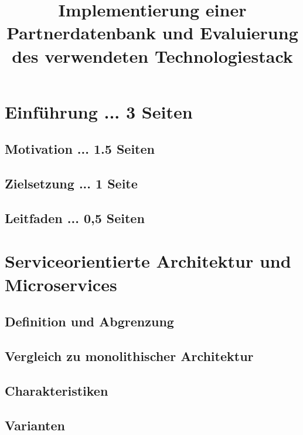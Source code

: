 \documentclass[master,german]{hgbthesis}
\title{Implementierung einer Partnerdatenbank und Evaluierung des verwendeten Technologiestack} %
\begin{document}

\frontmatter							%


\tableofcontents

%

\mainmatter          			%

\chapter{Einführung ... 3 Seiten}
\section{Motivation ... 1.5 Seiten}
\section{Zielsetzung ... 1 Seite}
\section{Leitfaden ... 0,5 Seiten}

\chapter{Serviceorientierte Architektur und Microservices}
\section{Definition und Abgrenzung}
\section{Vergleich zu monolithischer Architektur}
\section{Charakteristiken}
\section{Varianten}
\end{document}
